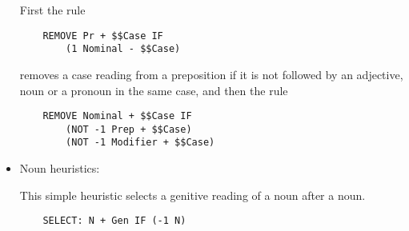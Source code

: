 \begin{itemize}
First the rule

{\small
\begin{Verbatim}
    REMOVE Pr + $$Case IF 
        (1 Nominal - $$Case)
\end{Verbatim}
}

removes a case reading from a preposition if it is not followed by an
adjective, noun or a pronoun in the same case, and then the rule

{\small
\begin{Verbatim}
    REMOVE Nominal + $$Case IF
        (NOT -1 Prep + $$Case) 
        (NOT -1 Modifier + $$Case)
\end{Verbatim}
}

\item Noun heuristics:

This simple heuristic selects a genitive reading of a noun after a noun.

{\small
\begin{Verbatim}
    SELECT: N + Gen IF (-1 N)
\end{Verbatim}
}
\end{itemize}

